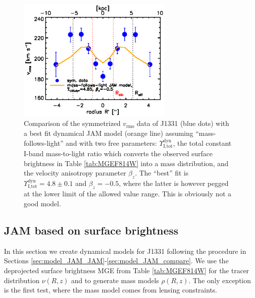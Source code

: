 \documentclass[useAMS,usenatbib]{mnras}
\begin{document}
\begin{figure}
  \centering
  \includegraphics[height=6cm]{fig/jam_A2_vrms.ps}
  \caption{Comparison of the symmetrized $v_\text{rms}$ data of J1331 (blue dots) with a best fit dynamical JAM model (orange line) assuming ``mass-follows-light'' and with two free parameters: $\Upsilon_\text{I,tot}^\text{dyn}$, the total constant I-band mass-to-light ratio which converts the observed surface brightness in Table \ref{tab:MGEF814W} into a mass distribution, and the velocity anisotropy parameter $\beta_z$. The ``best'' fit is $\Upsilon_\text{I,tot}^\text{dyn} = 4.8 \pm 0.1$ and $\beta_z = -0.5$, where the latter is however pegged at the lower limit of the allowed value range. This is obviously not a good model.}
  \label{fig:JAM_modelA2}
\end{figure}

\subsection{JAM based on surface brightness} \label{sec:results_JAM_SB}

In this section we create dynamical models for J1331 following the procedure in Sections \ref{sec:model_JAM_JAM}-\ref{sec:model_JAM_compare}. We use the deprojected surface brightness MGE from Table \ref{tab:MGEF814W} for the tracer distribution $\nu(R,z)$ and to generate mass models $\rho(R,z)$. The only exception is the first test, where the mass model comes from lensing constraints.
\end{document}
